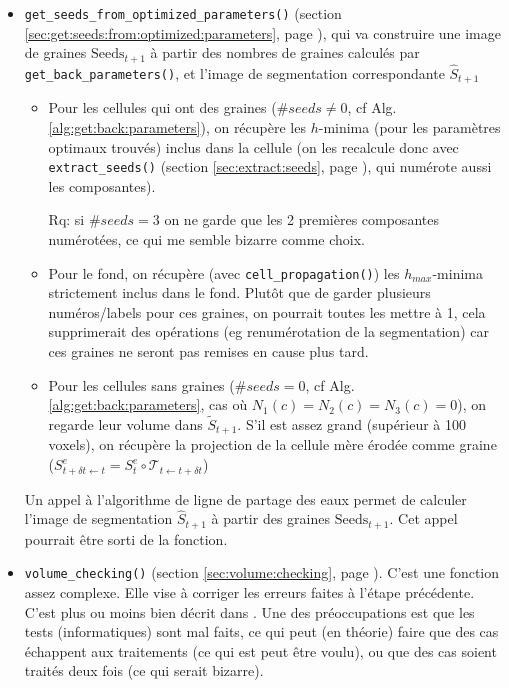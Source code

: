 \documentclass{article}
\begin{document}
\begin{itemize}
\begin{itemize}
%
%
\item \texttt{get\_seeds\_from\_optimized\_parameters()}
(section \ref{sec:get:seeds:from:optimized:parameters}, page \pageref{sec:get:seeds:from:optimized:parameters}), qui va construire une image de graines $\mathrm{Seeds}_{t+1}$  \`a partir des nombres de graines calcul\'es par \texttt{get\_back\_parameters()}, et l'image de segmentation correspondante $\hat{S}_{t+1}$

\begin{itemize}
\item Pour les cellules qui ont des graines ($\# seeds \neq 0$, cf Alg. \ref{alg:get:back:parameters}), on r\'ecup\`ere les $h$-minima (pour les param\`etres optimaux trouv\'es) inclus dans la cellule (on les recalcule donc avec \texttt{extract\_seeds()} (section \ref{sec:extract:seeds}, page \pageref{sec:extract:seeds}), qui num\'erote aussi les composantes).

Rq: si  $\# seeds = 3$ on ne garde que les 2 premi\`eres composantes num\'erot\'ees, ce qui me semble bizarre comme choix.

\item Pour le fond, on r\'ecup\`ere  (avec \texttt{cell\_propagation()}) les $h_{max}$-minima strictement inclus dans le fond. Plut\^ot que de garder plusieurs num\'eros/labels pour ces graines, on pourrait toutes les mettre \`a 1, cela supprimerait des op\'erations (eg renum\'erotation de la segmentation) car ces graines ne seront pas remises en cause plus tard.

\item Pour les cellules sans graines ($\# seeds = 0$, cf Alg. \ref{alg:get:back:parameters}, cas o\`u $N_1(c) = N_2(c) = N_3(c) = 0$), on regarde leur volume dans $\tilde{S}_{t+1}$. S'il est assez grand (sup\'erieur \`a 100 voxels), on r\'ecup\`ere la projection de la cellule m\`ere \'erod\'ee comme graine ($S^e_{t+\delta t \leftarrow t} = S^e_t \circ \mathcal{T}_{t \leftarrow t+\delta t}$)
\end{itemize}

Un appel \`a l'algorithme de ligne de partage des eaux permet de calculer l'image de segmentation $\hat{S}_{t+1}$ \`a partir des graines $\mathrm{Seeds}_{t+1}$. Cet appel pourrait \^etre sorti de la fonction.





%
%

\item \texttt{volume\_checking()}
(section \ref{sec:volume:checking}, page \pageref{sec:volume:checking}). C'est une fonction assez complexe. Elle vise \`a corriger les erreurs faites \`a l'\'etape pr\'ec\'edente. C'est plus ou moins bien d\'ecrit dans \cite[section 2.3.3.6, page 73]{guignard:tel-01278725}. Une des pr\'eoccupations est que les tests (informatiques) sont mal faits, ce qui peut (en th\'eorie) faire que des cas \'echappent aux traitements (ce qui est peut \^etre voulu), ou que des cas soient trait\'es deux fois (ce qui serait bizarre).


\end{itemize}
\end{itemize}
\end{document}
